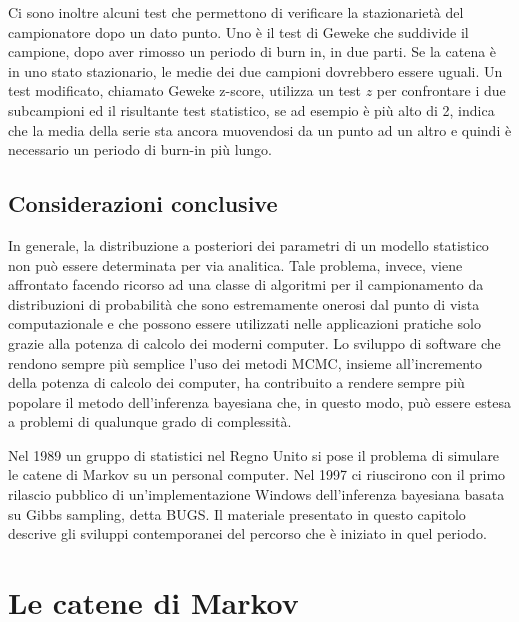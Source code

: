 \documentclass[
  10pt,
  italian,
  a4paper,
  extrafontsizes,onecolumn,openright
  ]{memoir}
\begin{document}
Ci sono inoltre alcuni test che permettono di verificare la stazionarietà del campionatore dopo un dato punto. Uno è il test di Geweke che suddivide il campione, dopo aver rimosso un periodo di burn in, in due parti. Se la catena è in uno stato stazionario, le medie dei due campioni dovrebbero essere uguali. Un test modificato, chiamato Geweke z-score, utilizza un test \(z\) per confrontare i due subcampioni ed il risultante test statistico, se ad esempio è più alto di 2, indica che la media della serie sta ancora muovendosi da un punto ad un altro e quindi è necessario un periodo di burn-in più lungo.

\hypertarget{considerazioni-conclusive}{%
\section*{Considerazioni conclusive}\label{considerazioni-conclusive}}

In generale, la distribuzione a posteriori dei parametri di un modello statistico non può essere determinata per via analitica. Tale problema, invece, viene affrontato facendo ricorso ad una classe di algoritmi per il campionamento da distribuzioni di probabilità che sono estremamente onerosi dal punto di vista computazionale e che possono essere utilizzati nelle applicazioni pratiche solo grazie alla potenza di calcolo dei moderni computer. Lo sviluppo di software che rendono sempre più semplice l'uso dei metodi MCMC, insieme all'incremento della potenza di calcolo dei computer, ha contribuito a rendere sempre più popolare il metodo dell'inferenza bayesiana che, in questo modo, può essere estesa a problemi di qualunque grado di complessità.

Nel 1989 un gruppo di statistici nel Regno Unito si pose il problema di simulare le catene di Markov su un personal computer. Nel 1997 ci riuscirono con il primo rilascio pubblico di un'implementazione Windows dell'inferenza bayesiana basata su Gibbs sampling, detta BUGS. Il materiale presentato in questo capitolo descrive gli sviluppi contemporanei del percorso che è iniziato in quel periodo.

\hypertarget{appendix-appendix}{%
\appendix}


\hypertarget{markov-chains}{%
\chapter{Le catene di Markov}\label{markov-chains}}
\end{document}
